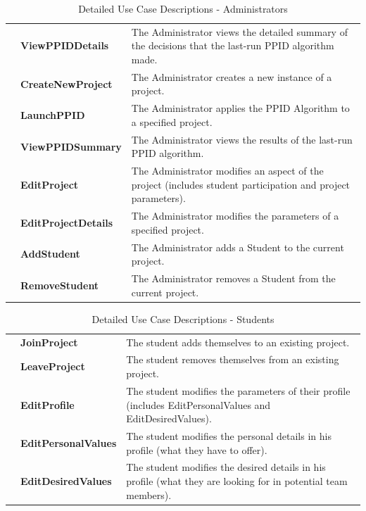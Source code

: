 \documentclass[12pt,letterpaper]{article}
\begin{document}
\begin{table}[H]
	\caption{Detailed Use Case Descriptions - Administrators}
	\vspace{1em}
	\begin{tabu} to 
		\viewppiddetails{} & ViewPPIDDetails & The Administrator views the detailed summary of the decisions that the last-run PPID
		algorithm made.\\
		\createnewproject{} & CreateNewProject & The Administrator creates a new instance of a project.\\
		\launchppid{} & LaunchPPID & The Administrator applies the PPID Algorithm to a specified project.\\
		\viewppidsummary{} & ViewPPIDSummary & The Administrator views the results of the last-run PPID algorithm.\\
		\editproject{} & EditProject & The Administrator modifies an aspect of the project (includes student participation 
		and project parameters).\\
		\editprojectdetails{} & EditProjectDetails & The Administrator modifies the parameters of a specified project.\\
		\addstudent{} & AddStudent & The Administrator adds a Student to the current project.\\
		\removestudent{} & RemoveStudent & The Administrator removes a Student from the current project.\\
	\end{tabu}
\end{table}

\begin{table}[H]
	\caption{Detailed Use Case Descriptions - Students}
	\vspace{1em}
	\begin{tabu} to 
		\joinproject{} & JoinProject & The student adds themselves to an existing project.\\
		\leaveproject{} & LeaveProject & The student removes themselves from an existing project.\\
		\editprofile{} & EditProfile & The student modifies the parameters of their profile (includes EditPersonalValues and EditDesiredValues).\\
		\editpersonalvalues{} & EditPersonalValues & The student modifies the personal details in his profile (what they have to offer). \\
		\editdesiredvalues{} & EditDesiredValues & The student modifies the desired details in his profile (what they are looking for in 
		potential team members). \\
	\end{tabu}
\end{table}
\end{document}
